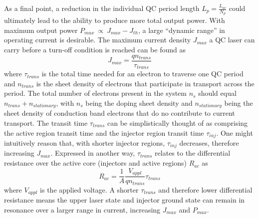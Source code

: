 As a final point, a reduction in the individual QC period length $L_p=\frac{L_{ac}}{N_p}$ could ultimately lead to the ability to produce more total output power.  With maximum output power $P_{max}~\propto~J_{max}-J_{th}$, a large ``dynamic range'' in operating current is desirable.  The maximum current density $J_{max}$ a QC laser can carry before a turn-off condition is reached can be found as \cite{Sirtori:JQE:1998} \cite{Aellen:JAP:2006}
\begin{equation}
J_{max} = \frac{q n_\textit{trans}}{\tau_\textit{trans}}
\end{equation}
where $\tau_\textit{trans}$ is the total time needed for an electron to traverse one QC period and $n_\textit{trans}$ is the sheet density of electrons that participate in transport across the period.  The total number of electrons present in the system $n_s$ should equal $n_\textit{trans}+n_\textit{stationary}$, with $n_s$ being the doping sheet density and $n_\textit{stationary}$ being the sheet density of conduction band electrons that do no contribute to current transport.  The transit time $\tau_\textit{trans}$ can be simplistically thought of as comprising the active region transit time and the injector region transit time $\tau_\textit{inj}$.  One might intuitively reason that, with shorter injector regions, $\tau_\textit{inj}$ decreases, therefore increasing $J_{max}$.  Expressed in another way, $\tau_\textit{trans}$ relates to the differential resistance over the active core (injectors and active regions) $R_{ac}$ as
\begin{equation}
R_{ac} = \frac{1}{A} \frac{V_{appl}}{q n_\textit{trans}} \tau_\textit{trans}
\end{equation}
where $V_{appl}$ is the applied voltage.  A shorter $\tau_\textit{trans}$ and therefore lower differential resistance means the upper laser state and injector ground state can remain in resonance over a larger range in current, increasing $J_{max}$ and $P_{max}$.


